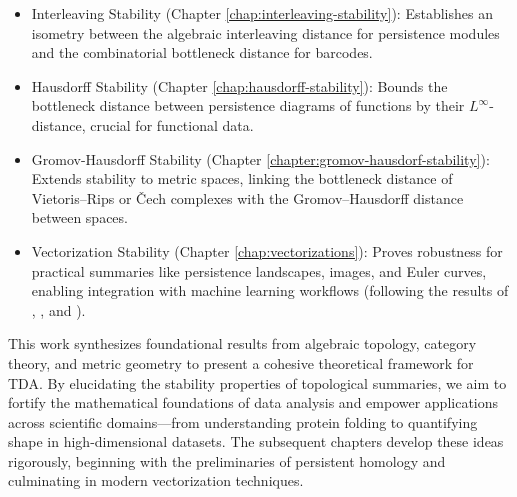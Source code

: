 \begin{itemize}
    \item Interleaving Stability (Chapter \ref{chap:interleaving-stability}): Establishes an isometry between the algebraic interleaving distance for persistence modules and the combinatorial bottleneck distance for barcodes.
    \item Hausdorff Stability (Chapter \ref{chap:hausdorff-stability}): Bounds the bottleneck distance between persistence diagrams of functions by their $L^{\infty}$-distance, crucial for functional data.
    \item Gromov-Hausdorff Stability (Chapter \ref{chapter:gromov-hausdorf-stability}): Extends stability to metric spaces, linking the bottleneck distance of Vietoris–Rips or Čech complexes with the Gromov–Hausdorff distance between spaces.
    \item Vectorization Stability (Chapter \ref{chap:vectorizations}): Proves robustness for practical summaries like persistence landscapes, images, and Euler curves, enabling integration with machine learning workflows (following the results of \cite{bubenik}, \cite{adams}, \cite{dlotko} and \cite{nina}).

\end{itemize}
This work synthesizes foundational results from algebraic topology, category theory, and metric geometry to present a cohesive theoretical framework for TDA. By elucidating the stability properties of topological summaries, we aim to fortify the mathematical foundations of data analysis and empower applications across scientific domains—from understanding protein folding to quantifying shape in high-dimensional datasets. The subsequent chapters develop these ideas rigorously, beginning with the preliminaries of persistent homology and culminating in modern vectorization techniques.